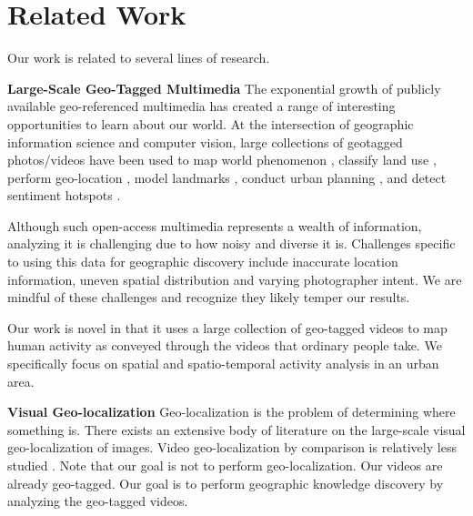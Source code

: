 \documentclass[sigconf]{acmart}
\begin{document}
	
	\section{Related Work}
	\label{sec:related_work}
	Our work is related to several lines of research.
	
	\noindent \textbf{Large-Scale Geo-Tagged Multimedia}
	The exponential growth of publicly available geo-referenced multimedia has created a range of interesting opportunities to learn about our world. At the intersection of geographic information science and computer vision, large collections of geotagged photos/videos have been used to map world phenomenon \cite{CrandallMapWorld09}, classify land use \cite{landuse_yi_sigspatial_2015}, perform geo-location \cite{Haysim2gps08,geolocalization_Gupta_2016}, model landmarks \cite{3dModelSnavely08}, conduct urban planning \cite{Magnetism_Paldino_2015}, and detect sentiment hotspots \cite{emotion_yi_sigspatial_2016}.
	
	Although such open-access multimedia represents a wealth of information, analyzing it is challenging due to how noisy and diverse it is. Challenges specific to using this data for geographic discovery include inaccurate location information, uneven spatial distribution and varying photographer intent. We are mindful of these challenges and recognize they likely temper our results.
	
	Our work is novel in that it uses a large collection of geo-tagged videos to map human activity as conveyed through the videos that ordinary people take. We specifically focus on spatial and spatio-temporal activity analysis in an urban area.
	
	\noindent \textbf{Visual Geo-localization}
	Geo-localization is the problem of determining where something is. There exists an extensive body of literature on the large-scale visual geo-localization of images. Video geo-localization by comparison is relatively less studied \cite{Overhead_Hammoud_2013,Structure_Bodensteiner_2015,event_More_2016,geolocalization_Gupta_2016}. 
	Note that our goal is not to perform geo-localization. Our videos are already geo-tagged. Our goal is to perform geographic knowledge discovery by analyzing the geo-tagged videos.
	
\end{document}
